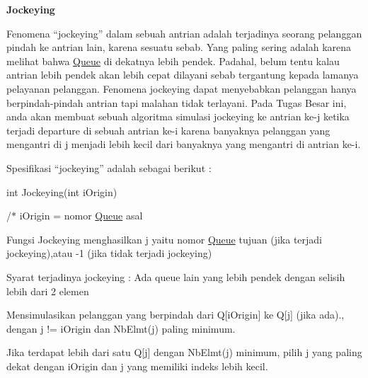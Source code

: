 {\bfseries Jockeying}\par
 

Fenomena “jockeying” dalam sebuah antrian adalah terjadinya seorang pelanggan pindah ke antrian lain, karena sesuatu sebab. Yang paling sering adalah karena melihat bahwa \hyperlink{class_queue}{Queue} di dekatnya lebih pendek. Padahal, belum tentu kalau antrian lebih pendek akan lebih cepat dilayani sebab tergantung kepada lamanya pelayanan pelanggan. Fenomena jockeying dapat menyebabkan pelanggan hanya berpindah-\/pindah antrian tapi malahan tidak terlayani. Pada Tugas Besar ini, anda akan membuat sebuah algoritma simulasi jockeying ke antrian ke-\/j ketika terjadi departure di sebuah antrian ke-\/i karena banyaknya pelanggan yang mengantri di j menjadi lebih kecil dari banyaknya yang mengantri di antrian ke-\/i.

Spesifikasi “jockeying” adalah sebagai berikut \-:\par
 int Jockeying(int i\-Origin)\par
 /$\ast$ i\-Origin = nomor \hyperlink{class_queue}{Queue} asal\par
 Fungsi Jockeying menghasilkan j yaitu nomor \hyperlink{class_queue}{Queue} tujuan (jika terjadi jockeying),atau -\/1 (jika tidak terjadi jockeying)\par
 Syarat terjadinya jockeying \-: Ada queue lain yang lebih pendek dengan selisih lebih dari 2 elemen\par
 Mensimulasikan pelanggan yang berpindah dari Q\mbox{[}i\-Origin\mbox{]} ke Q\mbox{[}j\mbox{]} (jika ada)., dengan j != i\-Origin dan Nb\-Elmt(j) paling minimum. \par
 Jika terdapat lebih dari satu Q\mbox{[}j\mbox{]} dengan Nb\-Elmt(j) minimum, pilih j yang paling dekat dengan i\-Origin dan j yang memiliki indeks lebih kecil. \par
 